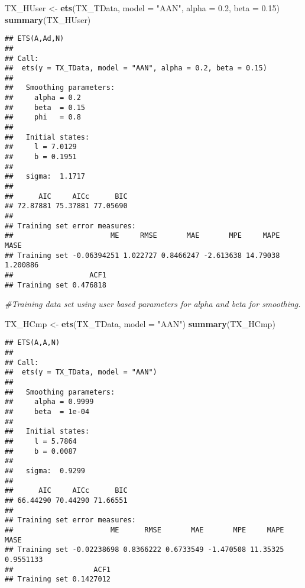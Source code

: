 \documentclass[
]{article}
\newenvironment{Shaded}{\begin{snugshade}}{\end{snugshade}}
\newcommand{\CommentTok}[1]{\textcolor[rgb]{0.56,0.35,0.01}{\textit{#1}}}
\newcommand{\DataTypeTok}[1]{\textcolor[rgb]{0.13,0.29,0.53}{#1}}
\newcommand{\FloatTok}[1]{\textcolor[rgb]{0.00,0.00,0.81}{#1}}
\newcommand{\KeywordTok}[1]{\textcolor[rgb]{0.13,0.29,0.53}{\textbf{#1}}}
\newcommand{\NormalTok}[1]{#1}
\newcommand{\StringTok}[1]{\textcolor[rgb]{0.31,0.60,0.02}{#1}}
\begin{document}
\begin{Shaded}
\begin{Highlighting}[]
\NormalTok{TX_HUser <-}\StringTok{ }\KeywordTok{ets}\NormalTok{(TX_TData, }\DataTypeTok{model =} \StringTok{"AAN"}\NormalTok{, }\DataTypeTok{alpha =} \FloatTok{0.2}\NormalTok{, }\DataTypeTok{beta =} \FloatTok{0.15}\NormalTok{)}
\KeywordTok{summary}\NormalTok{(TX_HUser)}
\end{Highlighting}
\end{Shaded}

\begin{verbatim}
## ETS(A,Ad,N) 
## 
## Call:
##  ets(y = TX_TData, model = "AAN", alpha = 0.2, beta = 0.15) 
## 
##   Smoothing parameters:
##     alpha = 0.2 
##     beta  = 0.15 
##     phi   = 0.8 
## 
##   Initial states:
##     l = 7.0129 
##     b = 0.1951 
## 
##   sigma:  1.1717
## 
##      AIC     AICc      BIC 
## 72.87881 75.37881 77.05690 
## 
## Training set error measures:
##                       ME     RMSE       MAE       MPE     MAPE     MASE
## Training set -0.06394251 1.022727 0.8466247 -2.613638 14.79038 1.200886
##                  ACF1
## Training set 0.476818
\end{verbatim}

\begin{Shaded}
\begin{Highlighting}[]
\CommentTok{#Training data set using user based parameters for alpha and beta for smoothing.}
\end{Highlighting}
\end{Shaded}

\begin{Shaded}
\begin{Highlighting}[]
\NormalTok{TX_HCmp <-}\StringTok{ }\KeywordTok{ets}\NormalTok{(TX_TData, }\DataTypeTok{model =} \StringTok{"AAN"}\NormalTok{)}
\KeywordTok{summary}\NormalTok{(TX_HCmp)}
\end{Highlighting}
\end{Shaded}

\begin{verbatim}
## ETS(A,A,N) 
## 
## Call:
##  ets(y = TX_TData, model = "AAN") 
## 
##   Smoothing parameters:
##     alpha = 0.9999 
##     beta  = 1e-04 
## 
##   Initial states:
##     l = 5.7864 
##     b = 0.0087 
## 
##   sigma:  0.9299
## 
##      AIC     AICc      BIC 
## 66.44290 70.44290 71.66551 
## 
## Training set error measures:
##                       ME      RMSE       MAE       MPE     MAPE      MASE
## Training set -0.02238698 0.8366222 0.6733549 -1.470508 11.35325 0.9551133
##                   ACF1
## Training set 0.1427012
\end{verbatim}
\end{document}
